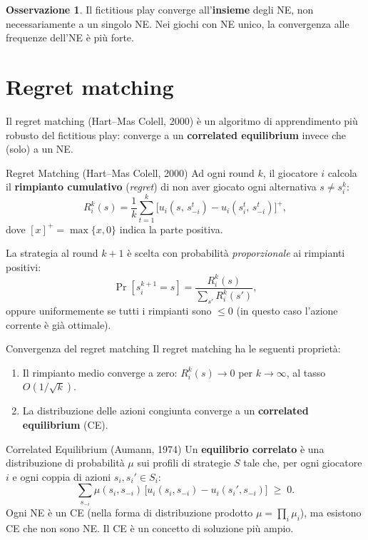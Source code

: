 \documentclass[12pt,a4paper,twoside]{book}
\theoremstyle{plain}
\theoremstyle{definition}
\newtheorem{remark}[theorem]{Osservazione}
\begin{document}
\begin{remark}
Il fictitious play converge all'\textbf{insieme} degli NE, non necessariamente a un singolo NE. Nei giochi con NE unico, la convergenza alle frequenze dell'NE è più forte.
\end{remark}

\section{Regret matching}

Il regret matching (Hart--Mas Colell, 2000) è un algoritmo di apprendimento più robusto del fictitious play: converge a un \textbf{correlated equilibrium} invece che (solo) a un NE.

\begin{defbox}{Regret Matching (Hart--Mas Colell, 2000)}
Ad ogni round $k$, il giocatore $i$ calcola il \textbf{rimpianto cumulativo} (\emph{regret}) di non aver giocato ogni alternativa $s \neq s_i^k$:
\[
  R_i^k(s) = \frac{1}{k}\sum_{t=1}^{k} \bigl[u_i(s,\, s_{-i}^t) - u_i(s_i^t,\, s_{-i}^t)\bigr]^+,
\]
dove $[x]^+ = \max\{x, 0\}$ indica la parte positiva.

La strategia al round $k+1$ è scelta con probabilità \emph{proporzionale} ai rimpianti positivi:
\[
  \Pr[s_i^{k+1} = s] = \frac{R_i^k(s)}{\sum_{s'} R_i^k(s')},
\]
oppure uniformemente se tutti i rimpianti sono $\le 0$ (in questo caso l'azione corrente è già ottimale).
\end{defbox}

\begin{thmbox}{Convergenza del regret matching}
Il regret matching ha le seguenti proprietà:
\begin{enumerate}
  \item Il rimpianto medio converge a zero: $R_i^k(s) \to 0$ per $k\to\infty$, al tasso $O(1/\sqrt{k})$.
  \item La distribuzione delle azioni congiunta converge a un \textbf{correlated equilibrium} (CE).
\end{enumerate}
\end{thmbox}

\begin{defbox}{Correlated Equilibrium (Aumann, 1974)}
Un \textbf{equilibrio correlato} è una distribuzione di probabilità $\mu$ sui profili di strategie $S$ tale che, per ogni giocatore $i$ e ogni coppia di azioni $s_i, s_i' \in S_i$:
\[
  \sum_{s_{-i}} \mu(s_i, s_{-i})\,\bigl[u_i(s_i, s_{-i}) - u_i(s_i', s_{-i})\bigr] \;\ge\; 0.
\]
Ogni NE è un CE (nella forma di distribuzione prodotto $\mu=\prod_i \mu_i$), ma esistono CE che non sono NE. Il CE è un concetto di soluzione più ampio.
\end{defbox}
\end{document}
